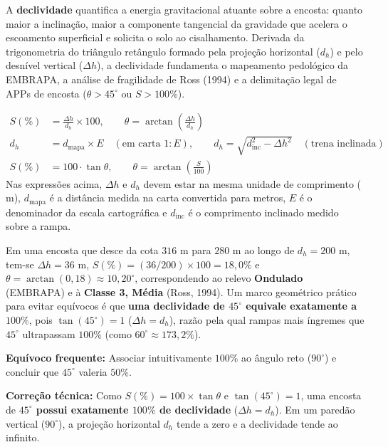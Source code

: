 A \textbf{declividade} quantifica a energia gravitacional atuante sobre a encosta: quanto maior a inclinação, maior a componente tangencial da gravidade que acelera o escoamento superficial e solicita o solo ao cisalhamento. Derivada da trigonometria do triângulo retângulo formado pela projeção horizontal ($d_h$) e pelo desnível vertical ($\Delta h$), a declividade fundamenta o mapeamento pedológico da EMBRAPA, a análise de fragilidade de Ross (1994) e a delimitação legal de APPs de encosta ($\theta > 45^\circ$ ou $S > 100\%$).

\begin{boxFormula}
\begin{align*}
  S(\%) &= \frac{\Delta h}{d_h} \times 100, \qquad \theta = \arctan\!\left(\frac{\Delta h}{d_h}\right) \\[4pt]
  d_h &= d_{\text{mapa}} \times E \quad (\text{em carta } 1{:}E), \qquad d_h = \sqrt{d_{\text{inc}}^2 - \Delta h^2} \quad (\text{trena inclinada}) \\[4pt]
  S(\%) &= 100 \cdot \tan\theta, \qquad \theta = \arctan\!\left(\frac{S}{100}\right)
\end{align*}
Nas expressões acima, $\Delta h$ e $d_h$ devem estar na mesma unidade de comprimento ($\text{m}$), $d_{\text{mapa}}$ é a distância medida na carta convertida para metros, $E$ é o denominador da escala cartográfica e $d_{\text{inc}}$ é o comprimento inclinado medido sobre a rampa.
\end{boxFormula}

Em uma encosta que desce da cota $316\text{ m}$ para $280\text{ m}$ ao longo de $d_h = 200\text{ m}$, tem-se $\Delta h = 36\text{ m}$, $S(\%) = (36/200)\times 100 = 18{,}0\%$ e $\theta = \arctan(0{,}18) \approx 10{,}20^\circ$, correspondendo ao relevo \textbf{Ondulado} (EMBRAPA) e à \textbf{Classe 3, Média} (Ross, 1994). Um marco geométrico prático para evitar equívocos é que \textbf{uma declividade de $45^\circ$ equivale exatamente a $100\%$}, pois $\tan(45^\circ) = 1$ ($\Delta h = d_h$), razão pela qual rampas mais íngremes que $45^\circ$ ultrapassam $100\%$ (como $60^\circ \approx 173{,}2\%$).

\begin{boxErro}
\textbf{Equívoco frequente:} Associar intuitivamente $100\%$ ao ângulo reto ($90^\circ$) e concluir que $45^\circ$ valeria $50\%$.\par
\textbf{Correção técnica:} Como $S(\%) = 100 \times \tan\theta$ e $\tan(45^\circ) = 1$, uma encosta de \textbf{$45^\circ$ possui exatamente $100\%$ de declividade} ($\Delta h = d_h$). Em um paredão vertical ($90^\circ$), a projeção horizontal $d_h$ tende a zero e a declividade tende ao infinito.
\end{boxErro}

